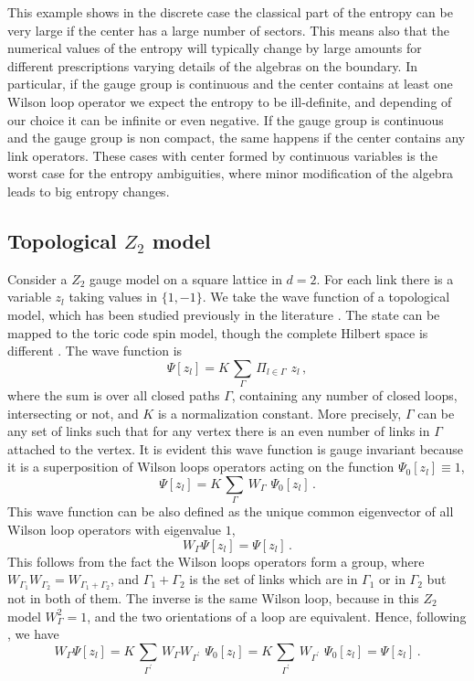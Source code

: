 \documentclass[12pt,a4paper]{article}
\newcommand{\be}{\begin{equation}}
\newcommand{\ee}{\end{equation}}
\def\be{\begin{equation}}
\def\ee{\end{equation}}
\begin{document}
 This example shows in the discrete case the classical part of the entropy can be very large if the center has a large number 
of sectors. This means also that the numerical values of the entropy will typically change by large amounts for different 
prescriptions varying details of the algebras on the boundary. In particular, if the gauge group is continuous and the center 
contains at least one Wilson loop operator we expect the entropy to be ill-definite, and depending of our choice it can be infinite 
or even negative. If the gauge group is continuous and the gauge group is non compact, the same happens if the center contains 
any link operators.  These cases with center formed by continuous variables is the worst case for the entropy ambiguities, where minor modification of 
the algebra leads to big entropy changes.

\subsection{Topological $Z_2$ model}

Consider a $Z_2$ gauge model on a square lattice in $d=2$. For each link there is a variable $z_l$ taking values in $\{1,-1\}$. We take the wave 
function of a topological model, which has been studied previously in the literature \cite{Polikarpov,donnelly,vidal}. The state can be mapped  
to the toric code spin model, though the complete Hilbert space is different \cite{kitaev97}. The wave function is
\be
\Psi[z_l]=K \,\sum_{\Gamma}\,\Pi_{l\in \Gamma}\,\, z_l\,, 
\ee
where the sum is over all closed paths $\Gamma$, containing any number of closed loops, intersecting or not, and $K$ is a normalization constant.
More precisely, $\Gamma$ can be any set of links such that for any vertex there is an even number of links in $\Gamma$ attached to the vertex. 
It is evident this wave function is gauge invariant because it is a superposition of Wilson loops operators acting on the function $\Psi_0[z_l]\equiv 1$,
\be
\Psi[z_l]=K \,\sum_{\Gamma}\,W_\Gamma\,\, \Psi_0[z_l]\,. 
\ee
This wave function can be also defined as the unique common eigenvector of all Wilson loop operators with eigenvalue $1$,
\be
W_\Gamma \Psi[z_l]=\Psi[z_l]\,.
\ee
This follows from the fact the Wilson loops operators form a group, where $W_{\Gamma_1}W_{\Gamma_2}=W_{\Gamma_1 + \Gamma_2}$, and $\Gamma_1+\Gamma_2$ 
is the set of links which are in $\Gamma_1$ or in $\Gamma_2$ but not in both of them. The inverse is the same Wilson loop, because in this $Z_2$ 
model $W_\Gamma^2=1$, and the two orientations of a loop are equivalent. Hence, following \cite{zanardi}, we have
 \be
 W_\Gamma \Psi[z_l]=K \,\sum_{\Gamma^\prime}\,W_\Gamma W_{\Gamma^\prime}\,\, \Psi_0[z_l]=K \,\sum_{\Gamma^\prime}\,W_{\Gamma^\prime}\,\, \Psi_0[z_l]=\Psi[z_l]\,.\label{52}
 \ee
\end{document}
